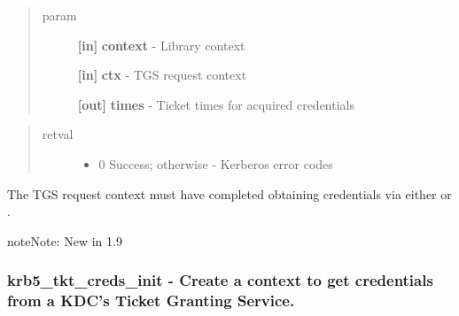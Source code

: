 \documentclass[letterpaper,10pt,english]{sphinxmanual}
\begin{document}
\begin{quote}\begin{description}
\item[{param}] \leavevmode
\textbf{{[}in{]}} \textbf{context} - Library context

\textbf{{[}in{]}} \textbf{ctx} - TGS request context

\textbf{{[}out{]}} \textbf{times} - Ticket times for acquired credentials

\end{description}\end{quote}
\begin{quote}\begin{description}
\item[{retval}] \leavevmode\begin{itemize}
\item {} 
0   Success; otherwise - Kerberos error codes

\end{itemize}

\end{description}\end{quote}

The TGS request context must have completed obtaining credentials via either {\hyperref[appdev/refs/api/krb5_tkt_creds_get:c.krb5_tkt_creds_get]{}} or {\hyperref[appdev/refs/api/krb5_tkt_creds_step:c.krb5_tkt_creds_step]{}} .

\begin{notice}{note}{Note:}
New in 1.9
\end{notice}


\subsubsection{krb5\_tkt\_creds\_init -  Create a context to get credentials from a KDC's Ticket Granting Service.}
\label{appdev/refs/api/krb5_tkt_creds_init:krb5-tkt-creds-init-create-a-context-to-get-credentials-from-a-kdc-s-ticket-granting-service}\label{appdev/refs/api/krb5_tkt_creds_init::doc}

\begin{fulllineitems}
\label{appdev/refs/api/krb5_tkt_creds_init:c.krb5_tkt_creds_init}
\end{fulllineitems}
\end{document}
